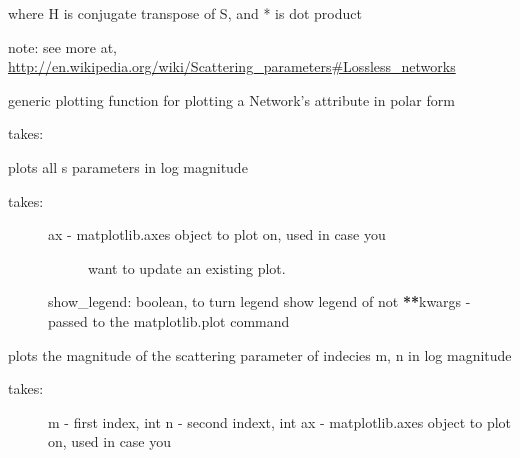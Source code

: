 \documentclass[letterpaper,10pt,english]{sphinxmanual}
\begin{document}
\begin{fulllineitems}
\begin{fulllineitems}
where H is conjugate transpose of S, and * is dot product

note:
see more at,
\href{http://en.wikipedia.org/wiki/Scattering\_parameters\#Lossless\_networks}{http://en.wikipedia.org/wiki/Scattering\_parameters\#Lossless\_networks}

\end{fulllineitems}


\begin{fulllineitems}
\label{auto_network:mwavepy.Network.plot_polar_generic}
generic plotting function for plotting a Network's attribute
in polar form

takes:

\end{fulllineitems}


\begin{fulllineitems}
\label{auto_network:mwavepy.Network.plot_s_all_db}
plots all s parameters in log magnitude
\begin{description}
\item[{takes:}] \leavevmode\begin{description}
\item[{ax - matplotlib.axes object to plot on, used in case you}] \leavevmode
want to update an existing plot.

\end{description}

show\_legend: boolean, to turn legend show legend of not
{\color{red}\bfseries{}**}kwargs - passed to the matplotlib.plot command

\end{description}

\end{fulllineitems}


\begin{fulllineitems}
\label{auto_network:mwavepy.Network.plot_s_db}
plots the magnitude of the scattering parameter of indecies m, n
in log magnitude
\begin{description}
\item[{takes:}] \leavevmode
m - first index, int
n - second indext, int
ax - matplotlib.axes object to plot on, used in case you
\begin{quote}


\end{quote}
\end{description}
\end{fulllineitems}
\end{fulllineitems}
\end{document}
